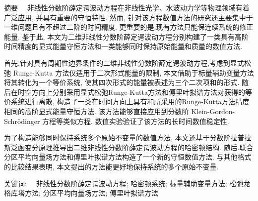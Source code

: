 
\begin{ChineseAbstract}[副教授]%
\item {\heiti 摘要\ \ }
非线性分数阶薛定谔波动方程在非线性光学、水波动力学等物理领域有着广泛应用, 并具有重要的守恒特性. 然而, 针对该方程数值方法的研究还主要集中于一维问题且有不超过二阶的时间精度. 更重要的是.现有方法只能保连续系统的修正能量. 鉴于此, 本文为二维非线性分数阶薛定谔波动方程分别构建了一类具有高阶时间精度的显式能量守恒方法和一类能够同时保持原始能量和质量的数值方法.  

首先,针对具有周期性边界条件的二维非线性分数阶薛定谔波动方程,考虑到显式松弛 Runge-Kutta 方法仅适用于二次形式能量的限制, 本文借助于标量辅助变量方法将其转化为一个等价系统, 使其四次形式的能量被表述为三个二次项和的形式. 随后在时空方向上分别采用显式松弛Runge-Kutta方法和傅里叶拟谱方法对获得的等价系统进行离散, 构造了一类在时间方向上具有和所采用的Runge-Kutta方法精度相同的高阶显式能量守恒方法. 该方法能够直接应用到分数阶 Klein-Gordon-Schr{\"o}dinger 方程等类似方程. 数值实验验证了该方法的长时间数值稳定性.

为了构造能够同时保持系统多个原始不变量的数值方法, 本文还基于分数阶拉普拉斯泛函变分原理推导出二维非线性分数阶薛定谔波动方程的哈密顿结构. 随后.联合分区平均向量场方法和傅里叶拟谱方法构造了一个新的守恒数值方法. 与其他格式的比较结果表明, 本文提出的方法能更好地保持系统的多个原始不变量.


\item {\heiti 关键词:\ \ } 非线性分数阶薛定谔波动方程; 哈密顿系统; 标量辅助变量方法; 松弛龙格库塔方法; 分区平均向量场方法; 傅里叶拟谱方法
\end{ChineseAbstract}

